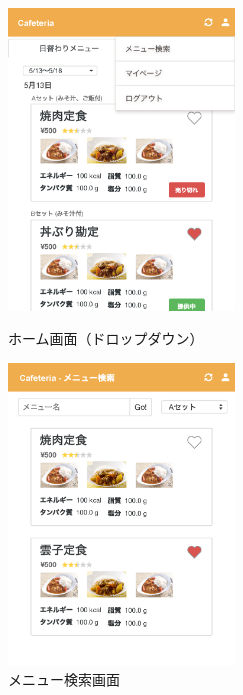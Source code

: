 \documentclass[a4paper]{ltjsarticle}
\begin{document}
    \begin{figure}[ht]
        \begin{minipage}[t]{.49\textwidth}
            \center
            \includegraphics[width=60mm]{ui/home-dropdown.png}
            \caption{ホーム画面（ドロップダウン）}
            \label{img:home-dropdown}
        \end{minipage}
        \begin{minipage}[t]{.49\textwidth}
            \center
            \includegraphics[width=60mm]{ui/menu-search.png}
            \caption{メニュー検索画面}
            \label{img:menu-search}
        \end{minipage}
    \end{figure}
\end{document}
